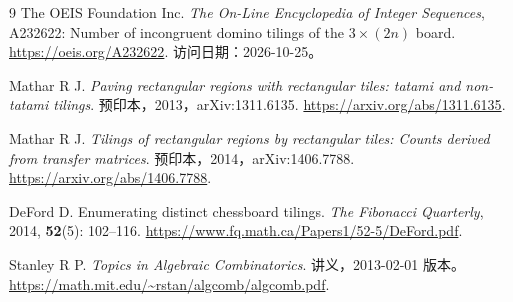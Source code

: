 \begin{thebibliography}{9}
The OEIS Foundation Inc.
\emph{The On-Line Encyclopedia of Integer Sequences}, A232622:
Number of incongruent domino tilings of the $3\times(2n)$ board.
\url{https://oeis.org/A232622}.
访问日期：2026-10-25。

Mathar R J.
\emph{Paving rectangular regions with rectangular tiles: tatami and non-tatami tilings}.
预印本，2013，arXiv:1311.6135.
\url{https://arxiv.org/abs/1311.6135}.

Mathar R J.
\emph{Tilings of rectangular regions by rectangular tiles: Counts derived from transfer matrices}.
预印本，2014，arXiv:1406.7788.
\url{https://arxiv.org/abs/1406.7788}.

DeFord D.
Enumerating distinct chessboard tilings.
\emph{The Fibonacci Quarterly}, 2014, \textbf{52}(5): 102--116.
\url{https://www.fq.math.ca/Papers1/52-5/DeFord.pdf}.

Stanley R P.
\emph{Topics in Algebraic Combinatorics}.
讲义，2013-02-01 版本。
\url{https://math.mit.edu/~rstan/algcomb/algcomb.pdf}.
\end{thebibliography}
